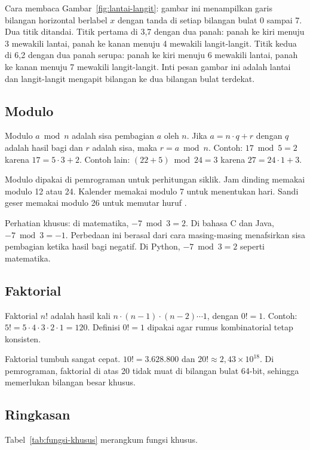 \documentclass[11pt,a4paper]{article}
\begin{document}
Cara membaca Gambar~\ref{fig:lantai-langit}: gambar ini menampilkan garis bilangan horizontal berlabel $x$ dengan tanda di setiap bilangan bulat 0 sampai 7. Dua titik ditandai. Titik pertama di 3,7 dengan dua panah: panah ke kiri menuju 3 mewakili lantai, panah ke kanan menuju 4 mewakili langit-langit. Titik kedua di 6,2 dengan dua panah serupa: panah ke kiri menuju 6 mewakili lantai, panah ke kanan menuju 7 mewakili langit-langit. Inti pesan gambar ini adalah lantai dan langit-langit mengapit bilangan ke dua bilangan bulat terdekat.

\subsection{Modulo}

Modulo $a \bmod n$ adalah sisa pembagian $a$ oleh $n$. Jika $a=n \cdot q+r$ dengan $q$ adalah hasil bagi dan $r$ adalah sisa, maka $r=a \bmod n$. Contoh: $17 \bmod 5=2$ karena $17=5 \cdot 3+2$. Contoh lain: $(22+5) \bmod 24=3$ karena $27=24 \cdot 1+3$.

Modulo dipakai di pemrograman untuk perhitungan siklik. Jam dinding memakai modulo 12 atau 24. Kalender memakai modulo 7 untuk menentukan hari. Sandi geser memakai modulo 26 untuk memutar huruf \cite{rosen}.

Perhatian khusus: di matematika, $-7 \bmod 3=2$. Di bahasa C dan Java, $-7 \bmod 3=-1$. Perbedaan ini berasal dari cara masing-masing menafsirkan sisa pembagian ketika hasil bagi negatif. Di Python, $-7 \bmod 3=2$ seperti matematika.

\subsection{Faktorial}

Faktorial $n!$ adalah hasil kali $n \cdot (n-1) \cdot (n-2) \cdots 1$, dengan $0!=1$. Contoh: $5!=5 \cdot 4 \cdot 3 \cdot 2 \cdot 1=120$. Definisi $0!=1$ dipakai agar rumus kombinatorial tetap konsisten.

Faktorial tumbuh sangat cepat. $10!=3{.}628{.}800$ dan $20! \approx 2{,}43 \times 10^{18}$. Di pemrograman, faktorial di atas 20 tidak muat di bilangan bulat 64-bit, sehingga memerlukan bilangan besar khusus.

\subsection{Ringkasan}

Tabel~\ref{tab:fungsi-khusus} merangkum fungsi khusus.
\end{document}
